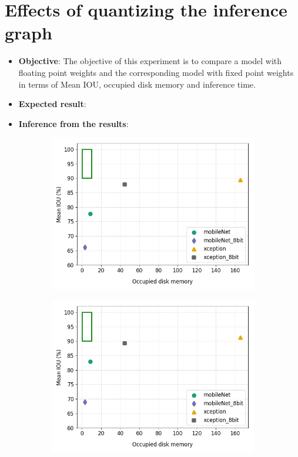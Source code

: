 \section{Effects of quantizing the inference graph}
	
	\begin{itemize}
		\item \textbf{Objective}: The objective of this experiment is to compare a model with floating point weights and the corresponding model with fixed point weights in terms of Mean IOU, occupied disk memory and inference time.
		\item \textbf{Expected result}:
		\item \textbf{Inference from the results}:
	\end{itemize}

	\begin{figure}
		\begin{subfigure}{.5\textwidth}
			\centering
			\includegraphics[width=1\linewidth]{images/q_mem_v_full}
		\end{subfigure}
		\begin{subfigure}{.5\textwidth}
			\centering
			\includegraphics[width=1\linewidth]{images/q_mem_v_size}

\end{subfigure}
\end{figure}
